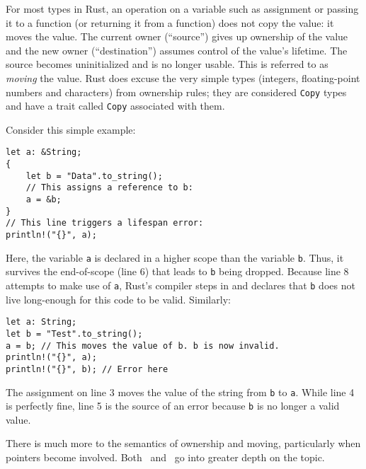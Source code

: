 For most types in Rust, an operation on a variable such as assignment or passing it to a function (or returning it from a function) does not copy the value: it moves the value. The current owner (``source'') gives up ownership of the value and the new owner (``destination'') assumes control of the value's lifetime. The source becomes uninitialized and is no longer usable. This is referred to as \textit{moving} the value. Rust does excuse the very simple types (integers, floating-point numbers and characters) from ownership rules; they are considered \texttt{Copy} types and have a trait called \texttt{Copy} associated with them.

Consider this simple example:

\begin{lstlisting}
let a: &String;
{
    let b = "Data".to_string();
    // This assigns a reference to b:
    a = &b;
}
// This line triggers a lifespan error:
println!("{}", a);
\end{lstlisting}

Here, the variable \texttt{a} is declared in a higher scope than the variable \texttt{b}. Thus, it survives the end-of-scope (line 6) that leads to \texttt{b} being dropped. Because line 8 attempts to make use of \texttt{a}, Rust's compiler steps in and declares that \texttt{b} does not live long-enough for this code to be valid. Similarly:

\begin{lstlisting}
let a: String;
let b = "Test".to_string();
a = b; // This moves the value of b. b is now invalid.
println!("{}", a);
println!("{}", b); // Error here
\end{lstlisting}

The assignment on line 3 moves the value of the string from \texttt{b} to \texttt{a}. While line 4 is perfectly fine, line 5 is the source of an error because \texttt{b} is no longer a valid value.

There is much more to the semantics of ownership and moving, particularly when pointers become involved. Both~\cite{rpl.2019} and~\cite{programming.rust.2021} go into greater depth on the topic.
